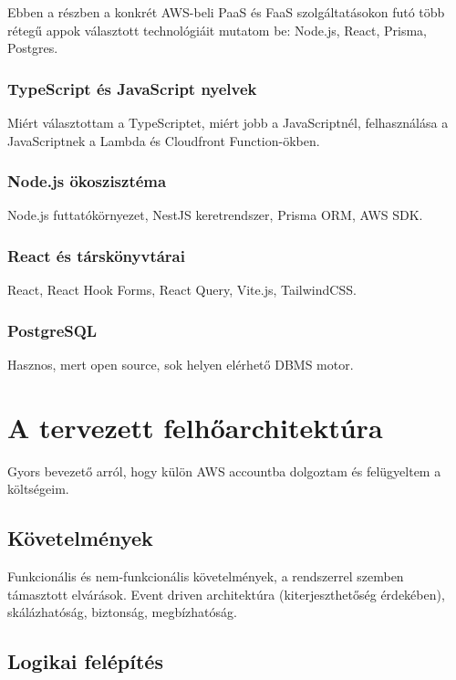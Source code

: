 Ebben a részben a konkrét AWS-beli PaaS és FaaS szolgáltatásokon futó több rétegű appok választott technológiáit mutatom be: Node.js, React, Prisma, Postgres.

\subsection{TypeScript és JavaScript nyelvek}

Miért választottam a TypeScriptet, miért jobb a JavaScriptnél, felhasználása a JavaScriptnek a Lambda és Cloudfront Function-ökben.

\subsection{Node.js ökoszisztéma}

Node.js futtatókörnyezet, NestJS keretrendszer, Prisma ORM, AWS SDK.

\subsection{React és társkönyvtárai}

React, React Hook Forms, React Query, Vite.js, TailwindCSS.

\subsection{PostgreSQL}

Hasznos, mert open source, sok helyen elérhető DBMS motor.

\chapter{A tervezett felhőarchitektúra}

Gyors bevezető arról, hogy külön AWS accountba dolgoztam és felügyeltem a költségeim.

\section{Követelmények}

Funkcionális és nem-funkcionális követelmények, a rendszerrel szemben támasztott elvárások. Event driven architektúra (kiterjeszthetőség érdekében), skálázhatóság, biztonság, megbízhatóság.

\section{Logikai felépítés}

